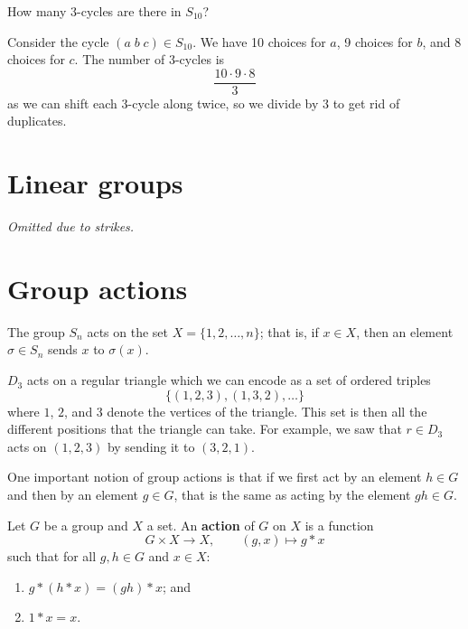 
\begin{example}
    How many $3$-cycles are there in $S_{10}$?
\end{example}

\begin{solution}
    Consider the cycle $(a\;b\;c) \in S_{10}$.
    We have 10 choices for $a$, 9 choices for $b$, and 8 choices for $c$.
    The number of $3$-cycles is
    \[
        \frac{10\cdot9\cdot8}{3}
    \]
    as we can shift each $3$-cycle along twice, so we divide by $3$ to get rid of duplicates.
\end{solution}

\chapter{Linear groups}

\begin{center}
    \emph{Omitted due to strikes.}
\end{center}

\chapter{Group actions}

\begin{example}
    The group $S_n$ acts on the set $X = \{1,2,\ldots,n\}$; that is,
    if $x \in X$, then an element $\sigma \in S_n$ sends $x$ to $\sigma(x)$.
\end{example}

\begin{example}
    $D_3$ acts on a regular triangle which we can encode as a set of ordered triples
    \[
        \{(1,2,3), (1,3,2), \ldots\}
    \]
    where $1$, $2$, and $3$ denote the vertices of the triangle.
    This set is then all the different positions that the triangle can take.
    For example, we saw that $r \in D_3$ acts on $(1,2,3)$ by sending it to $(3,2,1)$.
\end{example}

\begin{remark}
    One important notion of group actions is that if we first act by an element
    $h \in G$ and then by an element $g \in G$, that is the same as acting by the element
    $gh \in G$.
\end{remark}

\begin{definition}
    Let $G$ be a group and $X$ a set.
    An \textbf{action} of $G$ on $X$ is a function
    \[
        G \times X \to X, \qquad (g,x) \mapsto g * x
    \]
    such that for all $g,h \in G$ and $x \in X$:
    \begin{enumerate}
        \item $g * (h * x) = (gh) * x$; and
        \item $1 * x = x$.
    \end{enumerate}
\end{definition}

